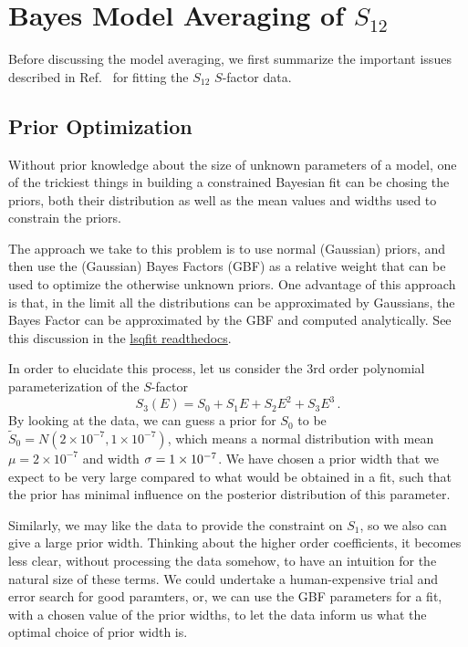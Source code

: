 \documentclass[prd,11pt,superscriptaddress,notitlepage,tightenlines,nofootinbib,floatfix]{revtex4-1}
\begin{document}
\section{Bayes Model Averaging of $S_{12}$ \label{sec:S_12_bma}}

Before discussing the model averaging, we first summarize the important issues described in Ref.~\cite{Moscoso:2021xog} for fitting the $S_{12}$ $S$-factor data.


\subsection{Prior Optimization \label{sec:prior_optimization}}

Without prior knowledge about the size of unknown parameters of a model, one of the trickiest things in building a constrained Bayesian fit can be chosing the priors, both their distribution as well as the mean values and widths used to constrain the priors.

The approach we take to this problem is to use normal (Gaussian) priors, and then use the (Gaussian) Bayes Factors (GBF) as a relative weight that can be used to optimize the otherwise unknown priors.
One advantage of this approach is that, in the limit all the distributions can be approximated by Gaussians, the Bayes Factor can be approximated by the GBF and computed analytically.  See this discussion in the 
\href{https://lsqfit.readthedocs.io/en/latest/overview.html?highlight=Bayes%20Factor#correlated-parameters-gaussian-bayes-factor}{lsqfit readthedocs}.

In order to elucidate this process, let us consider the 3rd order polynomial parameterization of the $S$-factor
\begin{equation}
    S_3(E) = S_0 + S_1 E + S_2 E^2 + S_3 E^3\, .
\end{equation}
By looking at the data, we can guess a prior for $S_0$ to be $\tilde{S}_0 = N(2\times10^{-7}, 1\times10^{-7})$, which means a normal distribution with mean $\mu=2\times10^{-7}$ and width ${\sigma}=1\times10^{-7}$.  We have chosen a prior width that we expect to be very large compared to what would be obtained in a fit, such that the prior has minimal influence on the posterior distribution of this parameter.

Similarly, we may like the data to provide the constraint on $S_1$, so we also can give a large prior width.  Thinking about the higher order coefficients, it becomes less clear, without processing the data somehow, to have an intuition for the natural size of these terms.  We could undertake a human-expensive trial and error search for good paramters, or, we can use the GBF parameters for a fit, with a chosen value of the prior widths, to let the data inform us what the optimal choice of prior width is.
\end{document}
